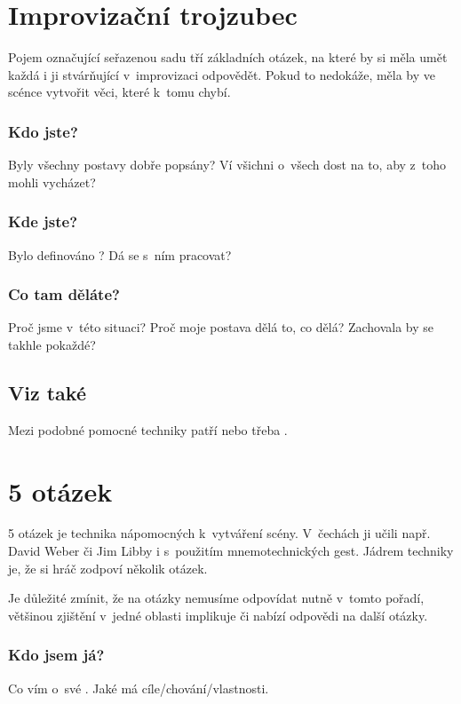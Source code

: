 \needspace{5cm} \section{Improvizační trojzubec} \label{improvizační trojzubec} Pojem označující seřazenou sadu tří základních otázek, na které by si měla umět každá  i  ji stvárňující v~improvizaci odpovědět. Pokud to nedokáže, měla by ve scénce vytvořit věci, které k~tomu chybí. 
 
\subsubsection{ Kdo jste? } Byly všechny postavy dobře popsány? Ví všichni o~všech dost na to, aby z~toho mohli vycházet? 
 
\subsubsection{ Kde jste? } Bylo definováno ? Dá se s~ním pracovat? 
 
\subsubsection{ Co tam děláte? } Proč jsme v~této situaci? Proč moje postava dělá to, co dělá? Zachovala by se takhle pokaždé? 
 
\subsection{ Viz také } Mezi podobné pomocné techniky patří  nebo třeba . 
 
 
 
\needspace{5cm} \section{5 otázek} \label{5 otázek} 5 otázek je technika nápomocných k~vytváření scény. V~čechách ji učili např. David Weber či Jim Libby i s~použitím mnemotechnických gest. 
Jádrem techniky je, že si hráč zodpoví několik otázek. 
 
Je důležité zmínit, že na otázky nemusíme odpovídat nutně v~tomto pořadí, většinou zjištění v~jedné oblasti implikuje či nabízí odpovědi na další otázky. 
 
\subsubsection{ Kdo jsem já? } Co vím o~své . Jaké má cíle/chování/vlastnosti. 
